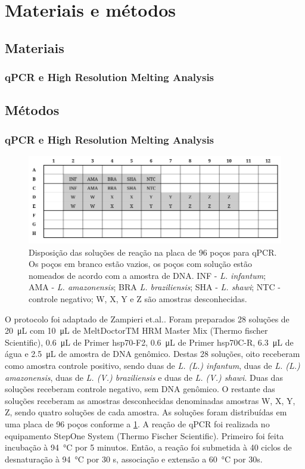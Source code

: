 \section{Materiais e métodos}
\subsection{Materiais}
\subsubsection{qPCR e High Resolution Melting Analysis}
     
\subsection{Métodos}
\subsubsection{qPCR e High Resolution Melting Analysis}

\begin{figure}
    \centering
    \includegraphics[width=.4\textwidth]{fig/placa_org.png}
    \caption{Disposição das soluções de reação na placa de 96 poços para qPCR. Os poços em branco estão vazios, os poços com solução estão nomeados de acordo com a amostra de DNA. INF - \textit{L. infantum}; AMA - \textit{L. amazonensis}; BRA \textit{L. braziliensis}; SHA - \textit{L. shawi}; NTC - controle negativo; W, X, Y e Z são amostras desconhecidas.}
    \label{wellorg}
\end{figure}

O protocolo foi adaptado de Zampieri et.al.\cite{HRMzampi2016}.
Foram preparados 28 soluções de \qty{20}{\micro\liter} com
\qty{10}{\micro\liter} de
MeltDoctorTM HRM Master Mix (Thermo fischer Scientific), \qty{0,6}{\micro\liter} de
Primer hsp70-F2, \qty{0,6}{\micro\liter} de Primer hsp70C-R,
\qty{6,3}{\micro\liter} de
água e \qty{2,5}{\micro\liter} de amostra de DNA genômico. Destas 28 soluções,
oito receberam como amostra controle positivo, sendo duas de \textit{L. (L.)
infantum}, duas de \textit{L. (L.) amazonensis}, duas de \textit{L. (V.)
braziliensis} e duas de \textit{L. (V.) shawi}. Duas das soluções receberam
controle negativo, sem DNA genômico. O restante das soluções receberam as
amostras desconhecidas denominadas amostras W, X, Y, Z, sendo quatro soluções de
cada amostra. As soluções foram distribuídas em uma placa de 96 poços conforme a
\cref{wellorg}. A reação de qPCR foi realizada no equipamento StepOne System
(Thermo Fischer Scientific). Primeiro foi feita incubação à \qty{94}{\celsius}
por 5 minutos.  Então, a reação foi submetida à 40 ciclos de desnaturação à
\qty{94}{\celsius} por 30 s, associação e extensão a \qty{60}{\celsius} por 30s. 

